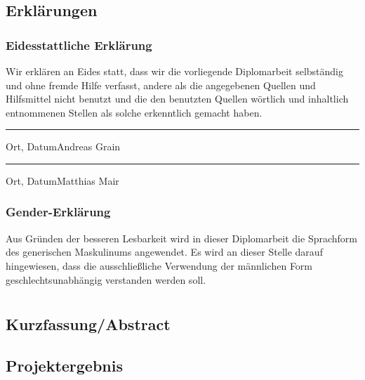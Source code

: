 \documentclass[a4paper, 12pt, twoside, openright
]{memoir}
\begin{document}
\pagestyle{normalpage}
\frontmatter
\begin{titlingpage}
	
\end{titlingpage}
\linespread{1.5}
\chapter{Erklärungen}
\section{Eidesstattliche Erklärung}
Wir erklären an Eides statt, dass wir die vorliegende Diplomarbeit selbständig und ohne fremde Hilfe verfasst, andere als die angegebenen Quellen und Hilfsmittel nicht benutzt und die den benutzten Quellen wörtlich und inhaltlich entnommenen Stellen als solche erkenntlich gemacht haben.
\vspace*{1.5cm}
\begin{center}
	\hrule
	\vspace*{0.2cm}
	Ort, Datum\hspace*{0.4\linewidth}Andreas Grain\\
	\vspace*{1.5cm}
	\hrule
	\vspace*{0.2cm}
	Ort, Datum\hspace*{0.4\linewidth}Matthias Mair
\end{center}
\vspace*{1.5cm}

\section{Gender-Erklärung}
Aus Gründen der besseren Lesbarkeit wird in dieser Diplomarbeit die Sprachform des generischen Maskulinums angewendet.
Es wird an dieser Stelle darauf hingewiesen, dass die ausschließliche Verwendung der männlichen Form geschlechtsunabhängig verstanden werden soll.
\cleartoverso

\tableofcontents
\cleartoverso
\part{}

\chapter{Kurzfassung/Abstract}

\chapter{Projektergebnis} 
\end{document}
